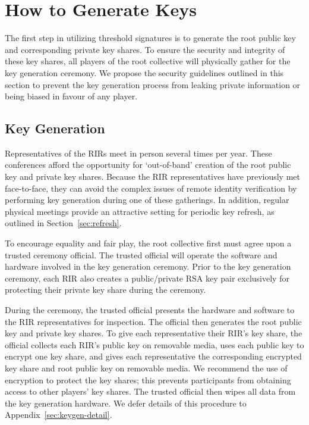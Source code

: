 \section{How to Generate Keys}
\label{sec:keygen}

The first step in utilizing threshold signatures is to generate the
root public key and corresponding private key shares. To ensure the
security and integrity of these key shares, all players of the root
collective will physically gather for the key generation ceremony.  We
propose the security guidelines outlined in this section to prevent
the key generation process from leaking private information or being
biased in favour of any player.

\subsection{Key Generation}

Representatives of the RIRs meet in person several times per
year. These conferences afford the opportunity for `out-of-band'
creation of the root public key and private key shares.  Because the
RIR representatives have previously met face-to-face, they can avoid
the complex issues of remote identity verification by performing key
generation during one of these gatherings. In addition, regular physical
meetings provide an attractive setting for periodic key refresh, as
outlined in Section~\ref{sec:refresh}.

To encourage equality and fair play, the root collective first must
agree upon a trusted ceremony official. The trusted official will
operate the software and hardware involved in the key generation
ceremony. Prior to the key generation ceremony, each RIR also creates a
public/private RSA key pair exclusively for protecting their private
key share during the ceremony.

During the ceremony, the trusted official presents the hardware and
software to the RIR representatives for inspection. The official then
generates the root public key and private key shares. To give each
representative their RIR's key share, the official collects each RIR's
public key on removable media, uses each public key to encrypt one key
share, and gives each representative the corresponding encrypted key
share and root public key on removable media. We recommend the use of
encryption to protect the key shares; this prevents participants from
obtaining access to other players' key shares. The trusted official
then wipes all data from the key generation hardware. We defer details
of this procedure to Appendix~\ref{sec:keygen-detail}.

